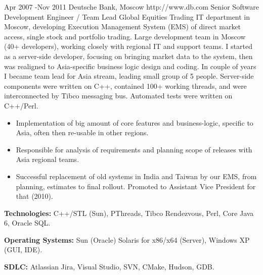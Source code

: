 \documentclass[10pt]{article} %
\begin{document}

\job
{Apr 2007 -}{Nov 2011}
{Deutsche Bank, Moscow}
{http://www.db.com}
{Senior Software Development Engineer / Team Lead}
{Global Equities Trading IT department in Moscow, developing Execution Management System (EMS) of direct market access,
single stock and portfolio trading. Large development team in Moscow (40+ developers), working closely with regional IT 
and support teams. I started as a server-side developer, focusing on bringing market data to the system, then was realigned
to Asia-specific business logic design and coding. In couple of years I became team lead for Asia stream, 
leading small group of 5 people. Server-side components were written on C++, contained 100+ working threads,
and were interconnected by Tibco messaging bus. Automated tests were written on C++/Perl.}
{\begin{itemize}
\item{Implementation of big amount of core features and business-logic, specific to Asia, often then re-usable in other regions.}
\item{Responsible for analysis of requirements and planning scope of releases with Asia regional teams.}
\item{Successful replacement of old systems in India and Taiwan by our EMS, from planning, estimates to final rollout.
Promoted to Assistant Vice President for that (2010).}
\end{itemize}}
{\rule{0mm}{5mm}\textbf{Technologies:} C++/STL (Sun), PThreads, Tibco Rendezvous, Perl, Core Java 6, Oracle SQL.\\
\rule{0mm}{5mm}\textbf{Operating Systems:} Sun (Oracle) Solaris for x86/x64 (Server), Windows XP (GUI, IDE).\\
\rule{0mm}{5mm}\textbf{SDLC:} Atlassian Jira, Visual Studio, SVN, CMake, Hudson, GDB.
}

\end{document}
